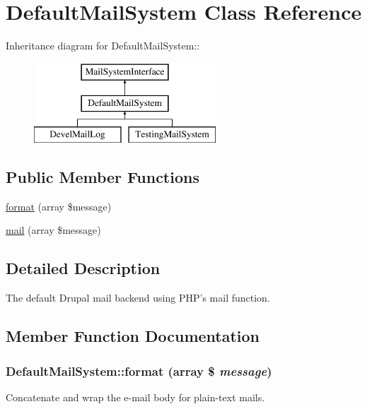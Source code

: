 \hypertarget{classDefaultMailSystem}{
\section{DefaultMailSystem Class Reference}
\label{classDefaultMailSystem}
}
Inheritance diagram for DefaultMailSystem::\begin{figure}[H]
\begin{center}
\leavevmode
\includegraphics[height=3cm]{classDefaultMailSystem}
\end{center}
\end{figure}
\subsection*{Public Member Functions}
\begin{DoxyCompactItemize}
\item 
\hyperlink{classDefaultMailSystem_a74a139262d6be87cc6c341fb48076cc1}{format} (array \$message)
\item 
\hyperlink{classDefaultMailSystem_a77a30a4f7b330e8fc811d8030004bb29}{mail} (array \$message)
\end{DoxyCompactItemize}


\subsection{Detailed Description}
The default Drupal mail backend using PHP's mail function. 

\subsection{Member Function Documentation}
\hypertarget{classDefaultMailSystem_a74a139262d6be87cc6c341fb48076cc1}{
\subsubsection[{format}]{\setlength{\rightskip}{0pt plus 5cm}DefaultMailSystem::format (array \$ {\em message})}}
\label{classDefaultMailSystem_a74a139262d6be87cc6c341fb48076cc1}
Concatenate and wrap the e-\/mail body for plain-\/text mails.


